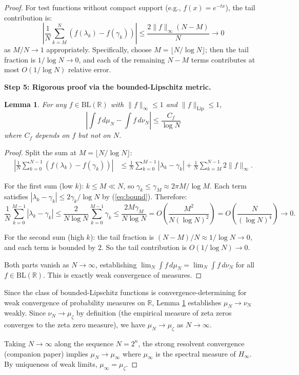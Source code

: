 \documentclass[11pt,a4paper]{article}
\newtheorem{lemma}[theorem]{Lemma}
\begin{document}
\begin{proof}
For test functions without compact support (e.g., $f(x) = e^{-tx}$),
the tail contribution is:
\[
\left|\frac{1}{N}\sum_{k=M}^N (f(\lambda_k) - f(\gamma_k))\right|
\leq \frac{2\|f\|_\infty (N-M)}{N} \to 0
\]
as $M/N \to 1$ appropriately. Specifically, choose
$M = \lfloor N/\log N\rfloor$; then the tail fraction is
$1/\log N \to 0$, and each of the remaining $N - M$ terms contributes
at most $O(1/\log N)$ relative error.

\medskip\noindent
\textbf{Step 5: Rigorous proof via the bounded-Lipschitz metric.}

\begin{lemma}\label{lem:bl}
For any $f \in \mathrm{BL}(\mathbb{R})$ with $\|f\|_\infty \leq 1$
and $\|f\|_{\mathrm{Lip}} \leq 1$,
\[
\left|\int f\,d\mu_N - \int f\,d\nu_N\right|
\leq \frac{C_f}{\log N}
\]
where $C_f$ depends on $f$ but not on $N$.
\end{lemma}

\begin{proof}
Split the sum at $M = \lfloor N/\log N\rfloor$:
\begin{align*}
\left|\frac{1}{N}\sum_{k=0}^{N-1} (f(\lambda_k) - f(\gamma_k))\right|
&\leq \frac{1}{N}\sum_{k=0}^{M-1} |\lambda_k - \gamma_k|
+ \frac{1}{N}\sum_{k=M}^{N-1} 2\|f\|_\infty.
\end{align*}

For the first sum (low $k$): $k \leq M \ll N$, so
$\gamma_k \leq \gamma_M \approx 2\pi M/\log M$. Each term satisfies
$|\lambda_k - \gamma_k| \leq 2\gamma_k/\log N$ by (\ref{eq:bound}).
Therefore:
\[
\frac{1}{N}\sum_{k=0}^{M-1} |\lambda_k - \gamma_k|
\leq \frac{2}{N\log N}\sum_{k=0}^{M-1} \gamma_k
\leq \frac{2M\gamma_M}{N\log N}
= O\left(\frac{M^2}{N(\log N)^2}\right)
= O\left(\frac{N}{(\log N)^4}\right)
\to 0.
\]

For the second sum (high $k$): the tail fraction is
$(N-M)/N \approx 1/\log N \to 0$, and each term is bounded by $2$.
So the tail contribution is $O(1/\log N) \to 0$.

Both parts vanish as $N \to \infty$, establishing
$\lim_N \int f\,d\mu_N = \lim_N \int f\,d\nu_N$ for all
$f \in \mathrm{BL}(\mathbb{R})$. This is exactly weak convergence
of measures.
\end{proof}

Since the class of bounded-Lipschitz functions is convergence-determining
for weak convergence of probability measures on $\mathbb{R}$, Lemma
\ref{lem:bl} establishes $\mu_N \to \nu_N$ weakly. Since
$\nu_N \to \mu_\zeta$ by definition (the empirical measure of zeta
zeros converges to the zeta zero measure), we have
$\mu_N \to \mu_\zeta$ as $N \to \infty$.

Taking $N \to \infty$ along the sequence $N = 2^n$, the strong
resolvent convergence (companion paper) implies $\mu_N \to \mu_\infty$
where $\mu_\infty$ is the spectral measure of $H_\infty$. By uniqueness
of weak limits, $\mu_\infty = \mu_\zeta$.
\end{proof}
\end{document}
